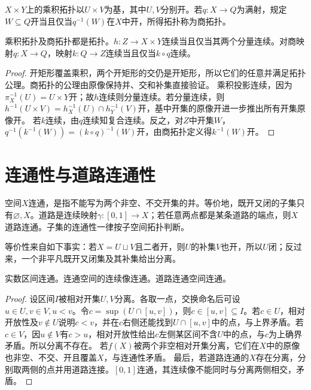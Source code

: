 \begin{definition}[乘积与商拓扑]
$X\times Y$上的乘积拓扑以$U\times V$为基，其中$U,V$分别开。若$q:X\to Q$为满射，规定$W\subseteq Q$开当且仅当$q^{-1}(W)$在$X$中开，所得拓扑称为商拓扑。
\end{definition}
\begin{theorem}[乘积与商的映射判别]\label{thm:product-quotient}
乘积拓扑及商拓扑都是拓扑。$h:Z\to X\times Y$连续当且仅当其两个分量连续。对商映射$q:X\to Q$，映射$k:Q\to Z$连续当且仅当$k\circ q$连续。
\end{theorem}
\begin{proof}
开矩形覆盖乘积，两个开矩形的交仍是开矩形，所以它们的任意并满足拓扑公理。商拓扑的公理由原像保持并、交和补集直接验证。
乘积投影连续，因为$\pi_X^{-1}(U)=U\times Y$开；故$h$连续则分量连续。若分量连续，则$h^{-1}(U\times V)=h_X^{-1}(U)\cap h_Y^{-1}(V)$开，基中开集的原像开进一步推出所有开集原像开。
若$k$连续，由$q$连续知复合连续。反之，对$Z$中开集$W$，$q^{-1}(k^{-1}(W))=(k\circ q)^{-1}(W)$开，由商拓扑定义得$k^{-1}(W)$开。
\end{proof}

\section{连通性与道路连通性}
\begin{definition}[连通与道路连通]
空间$X$连通，是指不能写为两个非空、不交开集的并。等价地，既开又闭的子集只有$\varnothing,X$。道路是连续映射$\gamma:[0,1]\to X$；若任意两点都是某条道路的端点，则$X$道路连通。子集的连通性一律按子空间拓扑判断。
\end{definition}
等价性来自如下事实：若$X=U\sqcup V$且二者开，则$U$的补集$V$也开，所以$U$闭；反过来，一个非平凡既开又闭集及其补集给出分离。
\begin{theorem}[区间、连续像与道路]
实数区间连通。连通空间的连续像连通。道路连通空间连通。
\end{theorem}
\begin{proof}
设区间$I$被相对开集$U,V$分离。各取一点，交换命名后可设$u\in U,v\in V,u<v$。令$c=\sup(U\cap[u,v])$，则$c\in[u,v]\subseteq I$。若$c\in U$，相对开放性及$v\notin U$说明$c<v$，并在$c$右侧还能找到$U\cap[u,v]$中的点，与上界矛盾。若$c\in V$，因$u\notin V$有$c>u$，相对开放性给出$c$左侧某区间不含$U$中的点，与$c$为上确界矛盾。所以分离不存在。
若$f(X)$被两个非空相对开集分离，它们在$X$中的原像也非空、不交、开且覆盖$X$，与连通性矛盾。
最后，若道路连通的$X$存在分离，分别取两侧的点并用道路连接。$[0,1]$连通，其连续像不能同时与分离两侧相交，矛盾。
\end{proof}

